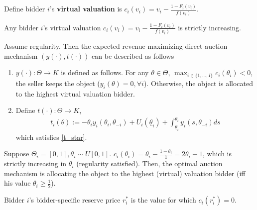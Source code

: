 \documentclass[11pt]{elegantbook}
\begin{document}
\begin{definition}
    \normalfont
    Define bidder $i$'s \textbf{virtual valuation} is $c_i(v_i)=v_i-\frac{1-F_i(v_i)}{f(v_i)}$.
\end{definition}

\begin{assumption}
    Any bidder $i$'s virtual valuation $c_i(v_i)=v_i-\frac{1-F_i(v_i)}{f(v_i)}$ is strictly increasing.
\end{assumption}

\begin{corollary}
    Assume regularity. Then the expected revenue maximizing direct auction mechanism $(y(\cdot),t(\cdot))$ can be described as follows
    \begin{enumerate}[(1).]
        \item $y(\cdot): \Theta \rightarrow K$ is defined as follows. For any $\theta\in \Theta$, $\max_{i\in\{1,...,I\}}c_i(\theta_i)<0$, the seller keeps the object ($y_i(\theta)=0,\forall  i$). Otherwise, the object is allocated to the highest virtual valuation bidder.
        \item Define $t(\cdot):\Theta \rightarrow K$,
        \begin{equation}
            \begin{aligned}
                t_i(\theta):=-\theta_i y_i(\theta_i,\theta_{-i})+U_i(\underline{\theta}_i)+\int_{\underline{\theta}_i}^{\theta_i}y_i(s,\theta_{-i})ds
            \end{aligned}
            \nonumber
        \end{equation}
        which satisfies \eqref{t_star}.
    \end{enumerate}
\end{corollary}

\begin{example}
    Suppose $\Theta_i=[0,1],\theta_i\sim U[0,1]$. $c_i(\theta_i)=\theta_i-\frac{1-\theta_i}{1}=2\theta_i-1$, which is strictly increasing in $\theta_i$ (regularity satisfied). Then, the optimal auction mechanism is allocating the object to the highest (virtual) valuation bidder (iff his value $\theta_i\geq\frac{1}{2}$).
\end{example}

\begin{definition}
    \normalfont
    Bidder $i$'s bidder-specific reserve price $r_i^*$ is the value for which $c_i(r_i^*)=0$.
\end{definition}
\end{document}
